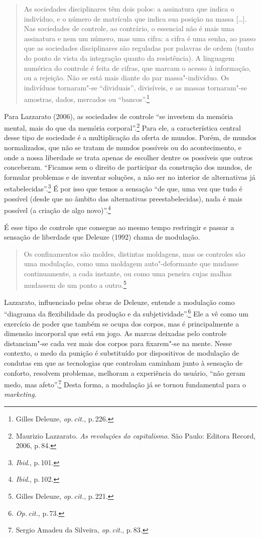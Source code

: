 \begin{quote}
As sociedades disciplinares têm dois polos: a assinatura que indica o
indivíduo, e o número de matrícula que indica sua posição na massa
{[}\ldots{}{]}. Nas sociedades de controle, ao contrário, o essencial não é mais
uma assinatura e nem um número, mas uma cifra: a cifra é uma senha, ao
passo que as sociedades disciplinares são reguladas por palavras de
ordem (tanto do ponto de vista da integração quanto da resistência). A
linguagem numérica do controle é feita de cifras, que marcam o acesso à
informação, ou a rejeição. Não se está mais diante do par
massa"-indivíduo. Os indivíduos tornaram"-se ``dividuais'', divisíveis, e
as massas tornaram"-se amostras, dados, mercados ou ``bancos''.\footnote{Gilles Deleuze, \textit{op.\,cit.}, p.\,226.}
\end{quote}

Para Lazzarato (2006), as sociedades de controle ``se investem da memória mental, mais do que
da memória corporal''.\footnote{Maurizio Lazzarato. \emph{As revoluções do capitalismo}. São Paulo: Editora
Record, 2006, p.\,84.} Para ele, a característica central desse
tipo de sociedade é a multiplicação da oferta de mundos. Porém, de
mundos normalizados, que não se tratam de mundos possíveis ou do
acontecimento, e onde a nossa liberdade se trata apenas de escolher
dentre os possíveis que outros conceberam. ``Ficamos sem o direito de
participar da construção dos mundos, de formular problemas e de inventar
soluções, a não ser no interior de alternativas já estabelecidas''.\footnote{\textit{Ibid}., p.\,101.}
É por isso que temos a sensação ``de que, uma vez que tudo é possível
(desde que no âmbito das alternativas preestabelecidas), nada é mais
possível (a criação de algo novo)''.\footnote{\textit{Ibid}., p.\,102.}

É esse tipo de controle que consegue ao mesmo tempo restringir e passar
a sensação de liberdade que Deleuze (1992) chama de modulação.

\begin{quote}
Os confinamentos são moldes, distintas moldagens, mas os controles são
uma modulação, como uma moldagem auto"-deformante que mudasse
continuamente, a cada instante, ou como uma peneira cujas malhas
mudassem de um ponto a outro.\footnote{Gilles Deleuze, \textit{op.\,cit.}, p.\,221.}
\end{quote}

Lazzarato, influenciado pelas obras de Deleuze, entende a
modulação como ``diagrama da flexibilidade da produção e da
subjetividade''.\footnote{\textit{Op.\,cit.}, p.\,73.} Ele a vê como um exercício de poder que também se
ocupa dos corpos, mas é principalmente a dimensão incorporal que está em
jogo. As marcas deixadas pelo controle distanciam"-se cada vez mais dos
corpos para fixarem"-se na mente. Nesse contexto, o medo da punição é
substituído por dispositivos de modulação de condutas em que as
tecnologias que controlam caminham junto à sensação de conforto,
resolvem problemas, melhoram a experiência do usuário, ``não geram medo,
mas afeto''.\footnote{Sergio Amadeu da Silveira, \textit{op.\,cit.}, p.\,83.} Desta forma, a modulação já se tornou fundamental para o \emph{marketing}.

